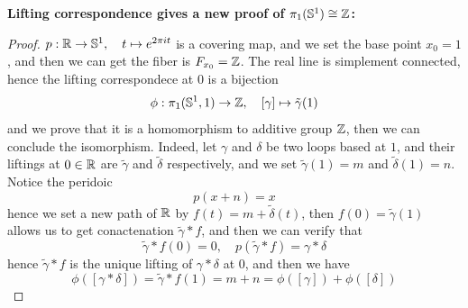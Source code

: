 \documentclass[12pt,a4paper]{article}
\begin{document}
\textbf{Lifting correspondence gives a new proof of \(\pi_1(\mathbb{S}^1) \cong \mathbb{Z}\):}
\begin{proof}
    \(p:\mathbb{R} \to \mathbb{S}^1,\quad t \mapsto e^{2\pi i t}\) is a covering map, and we set the base point \(x_0 = 1\), and then we can get the fiber is \(F_{x_0} = \mathbb{Z}\). The real line is simplement connected, hence the lifting correspondece at \(0\) is a bijection
    \[\phi: \pi_1(\mathbb{S}^1,1) \to \mathbb{Z}, \quad [\gamma] \mapsto \tilde{\gamma}(1)\]
    and we prove that it is a homomorphism to additive group \(\mathbb{Z}\), then we can conclude the isomorphism. Indeed, let \(\gamma\) and \(\delta\) be two loops based at \(1\), and their liftings at \(0 \in \mathbb{R}\) are \(\tilde{\gamma}\) and \(\tilde{\delta}\) respectively, and we set \(\tilde{\gamma}(1) = m\) and \(\tilde{\delta}(1) = n\). Notice the peridoic
    \[p(x+n)  = x\]
    hence we set a new path of \(\mathbb{R}\) by \(f(t) = m + \tilde{\delta}(t)\), then \(f(0) = \tilde{\gamma}(1)\) allows us to get conactenation \(\tilde{\gamma} * f\), and then we can verify that
    \[\tilde{\gamma}*f(0) = 0, \quad p(\tilde{\gamma}*f) = \gamma * \delta\]
    hence \(\tilde{\gamma}*f\) is the unique lifting of \(\gamma * \delta\) at \(0\), and then we have
    \[\phi([\gamma*\delta]) = \tilde{\gamma}*f(1) = m+n = \phi([\gamma])+ \phi([\delta])\]

\end{proof}
\end{document}
